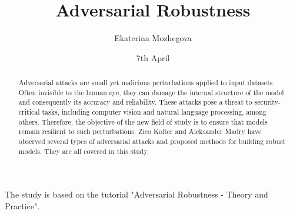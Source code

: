 \documentclass{article}
\title{Adversarial Robustness}
\author{Ekaterina Mozhegova}
\date{7th April}
\begin{document}
\maketitle

The study is based on the tutorial "Adversarial Robustness - Theory and Practice".

\begin{abstract}


  Adversarial attacks are small yet malicious perturbations applied to input datasets. Often invisible to the human eye, they can damage the internal structure of the model and 
  consequently its accuracy and reliability. These attacks pose a threat to security-critical tasks, including computer vision and natural language processing, among others.
  Therefore, the objective of the new field of study is to ensure that models remain resilient to such perturbations.  
  Zico Kolter and Aleksander Madry have observed several types of adversarial attacks and proposed methods for building robust models. They are all covered in this study. 
  
\end{abstract}

\tableofcontents
\newpage





\end{document}
